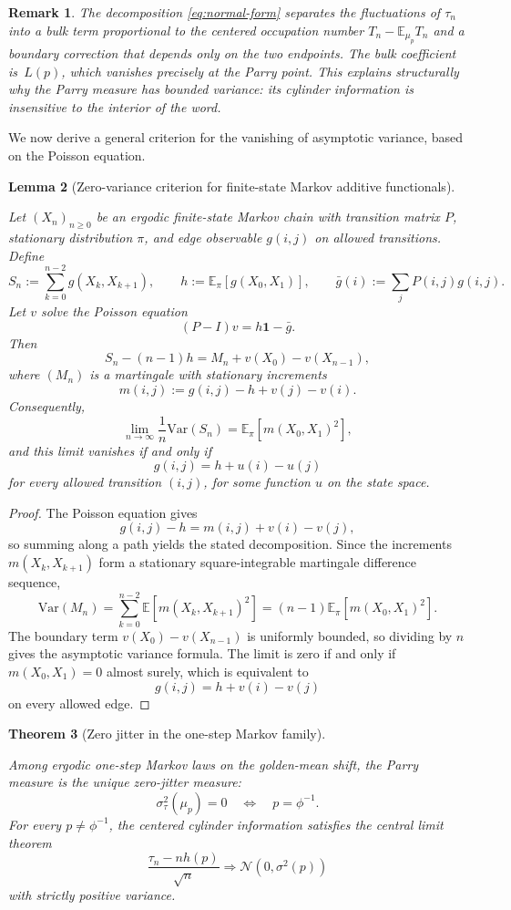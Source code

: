 \documentclass[pdflatex,sn-basic,Numbered]{sn-jnl}
\theoremstyle{thmstyleone}
\newtheorem{theorem}{Theorem}[section]
\newtheorem{lemma}[theorem]{Lemma}
\theoremstyle{thmstyletwo}
\newtheorem{remark}[theorem]{Remark}
\theoremstyle{thmstylethree}
\newcommand{\EE}{\mathbb{E}}
\newcommand{\Var}{\mathrm{Var}}
\newcommand{\leanverified}[1]{}
\begin{document}
\begin{remark}\label{rem:normal-form}
The decomposition \eqref{eq:normal-form} separates the fluctuations of $\tau_n$ into a bulk term proportional to the centered occupation number $T_n-\EE_{\mu_p}T_n$ and a boundary correction that depends only on the two endpoints. The bulk coefficient is~$L(p)$, which vanishes precisely at the Parry point. This explains \emph{structurally} why the Parry measure has bounded variance: its cylinder information is insensitive to the interior of the word.
\end{remark}

We now derive a general criterion for the vanishing of asymptotic variance, based on the Poisson equation.

\begin{lemma}[Zero-variance criterion for finite-state Markov additive functionals]\label{lem:markov-zero-variance}
\leanverified{paper_zero_jitter_markov_zero_variance}
Let $(X_n)_{n\ge 0}$ be an ergodic finite-state Markov chain with transition matrix $P$, stationary distribution $\pi$, and edge observable $g(i,j)$ on allowed transitions. Define
\[
S_n:=\sum_{k=0}^{n-2}g(X_k,X_{k+1}),
\qquad
h:=\EE_\pi[g(X_0,X_1)],
\qquad
\bar g(i):=\sum_jP(i,j)g(i,j).
\]
Let $v$ solve the Poisson equation
\[
(P-I)v=h\mathbf{1}-\bar g.
\]
Then
\[
S_n-(n-1)h=M_n+v(X_0)-v(X_{n-1}),
\]
where $(M_n)$ is a martingale with stationary increments
\[
m(i,j):=g(i,j)-h+v(j)-v(i).
\]
Consequently,
\[
\lim_{n\to\infty}\frac{1}{n}\Var(S_n)=\EE_\pi[m(X_0,X_1)^2],
\]
and this limit vanishes if and only if
\[
g(i,j)=h+u(i)-u(j)
\]
for every allowed transition $(i,j)$, for some function $u$ on the state space.
\end{lemma}

\begin{proof}
The Poisson equation gives
\[
g(i,j)-h=m(i,j)+v(i)-v(j),
\]
so summing along a path yields the stated decomposition. Since the increments $m(X_k,X_{k+1})$ form a stationary square-integrable martingale difference sequence,
\[
\Var(M_n)=\sum_{k=0}^{n-2}\EE[m(X_k,X_{k+1})^2]=(n-1)\EE_\pi[m(X_0,X_1)^2].
\]
The boundary term $v(X_0)-v(X_{n-1})$ is uniformly bounded, so dividing by $n$ gives the asymptotic variance formula. The limit is zero if and only if $m(X_0,X_1)=0$ almost surely, which is equivalent to
\[
g(i,j)=h+v(i)-v(j)
\]
on every allowed edge.
\end{proof}

\begin{theorem}[Zero jitter in the one-step Markov family]\label{thm:parry-rigidity}
\leanverified{paper_zero_jitter_parry_rigidity}
Among ergodic one-step Markov laws on the golden-mean shift, the Parry measure is the unique zero-jitter measure:
\[
\sigma_\tau^2(\mu_p)=0
\quad\Longleftrightarrow\quad
p=\phi^{-1}.
\]
For every $p\neq \phi^{-1}$, the centered cylinder information satisfies the central limit theorem
\[
\frac{\tau_n-nh(p)}{\sqrt{n}}
\Rightarrow
\mathcal{N}(0,\sigma^2(p))
\]
with strictly positive variance.
\end{theorem}
\end{document}
